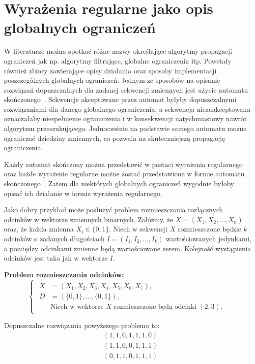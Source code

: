 \section{Wyrażenia regularne jako opis globalnych ograniczeń}
\par
W literaturze można spotkać różne nazwy określające algorytmy propagacji ograniczeń jak np. algorytmy filtrujące,
globalne ograniczenia itp. Powstały również zbiory zawierające opisy działania oraz sposoby implementacji poszczególnych
globalnych ograniczeń. Jednym ze sposobów na opisanie rozwiązań dopuszczalnych dla zadanej sekwencji zmiennych jest
użycie automatu skończonego~\cite{Automata}.
Sekwencje akceptowane przez automat byłyby dopuszczalnymi rozwiązaniami dla danego globalnego ograniczenia, a sekwencja
niezaakceptowana oznaczałaby niespełnienie ograniczenia i w konsekwencji natychmiastowy nawrót algorytmu przeszukującego.
Jednocześnie na podstawie samego automatu można ograniczać dziedziny zmiennych, co pozwala na skuteczniejszą propagację
ograniczenia.
\par
Każdy automat skończony można przedstawić w postaci wyrażenia regularnego oraz każde wyrażenie regularne możne zostać
przedstawione w formie automatu skończonego~\cite{FormalLanguages2}. Zatem dla niektórych globalnych ograniczeń wygodnie
byłoby opisać ich działanie w formie wyrażenia regularnego.
\par
Jako dobry przykład może posłużyć problem rozmieszczania rozłącznych odcinków w wektorze zmiennych binarnych.
Załóżmy, że $X = (X_1, X_2, ... , X_n)$ oraz, że każda zmienna $X_i \in \{ 0, 1 \} $. Niech w sekwencji $X$ rozmieszczone
będzie $k$ odcinków o zadanych długościach $I = (I_1, I_2, ..., I_k)$ wartościowanych jedynkami, a pomiędzy odcinkami 
zmienne będą wartościowane zerem. Kolejność wystąpienia odcinków jest taka jak w wektorze $I$. 
\par
\begin{example}
\textbf{Problem rozmieszczania odcinków:}
\begin{equation}
    \begin{cases}
        \begin{aligned}
            X &= (X_1, X_2, X_3, X_4, X_5, X_6, X_7), \\
            D &= (\{0, 1\}, ... , \{0, 1\}), \\
            &\text{Niech w wektorze $X$ rozmieszczone będą odcinki $(2, 3)$.}
        \end{aligned}
    \end{cases}
\end{equation}
\par
Dopuszczalne rozwiązania powyższego problemu to:
\begin{equation}
    \begin{aligned}
        &(1, 1, 0, 1, 1, 1, 0) \\
        &(1, 1, 0, 0, 1, 1, 1) \\
        &(0, 1, 1, 0, 1, 1, 1) \\
    \end{aligned}
\end{equation}
\par
\end{example}
